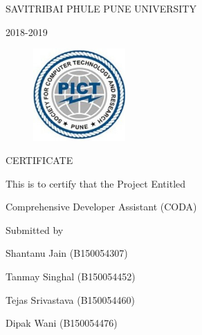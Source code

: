 \documentclass[oneside,a4paper,12pt, times]{book}
\begin{document}
\newpage

{\bfseries \fontsize{14}{12} \selectfont \centerline{SAVITRIBAI PHULE PUNE UNIVERSITY}
\vspace*{1\baselineskip}} 
{\bfseries \fontsize{14}{12} \selectfont \centerline{2018-2019}
\vspace*{1\baselineskip}} 
\begin{figure}[ht]
\centering
\includegraphics[width=100pt]{college_logo.jpg}
\end{figure}





{\bfseries \fontsize{16}{12} \selectfont \centerline{CERTIFICATE} 
\vspace*{2\baselineskip}} 

\centerline{This is to certify that the Project Entitled}
\vspace*{.5\baselineskip} 


{\bfseries \fontsize{14}{12} \selectfont \centerline{Comprehensive Developer Assistant (CODA)}
\vspace*{0.5\baselineskip}}

\centerline{Submitted by}
\vspace*{0.5\baselineskip} 
\centerline{Shantanu Jain  \hspace{25 mm} (B150054307)}
\centerline{Tanmay Singhal \hspace{25 mm} (B150054452)}
\centerline{Tejas Srivastava \hspace{25 mm}    (B150054460)}
\centerline{Dipak Wani \hspace{25 mm} (B150054476)}
\end{document}
